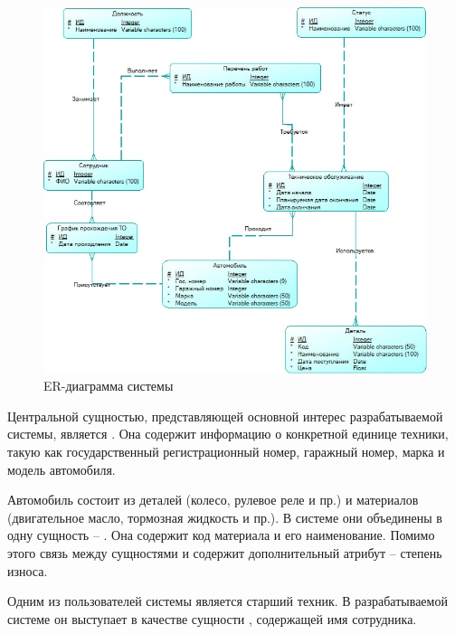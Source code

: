 \documentclass[../nirs.tex]{subfiles}
\begin{document}
\clearpage
\begin{landscape}

\begin{figure}[hp!]
  \centering
  \includegraphics[keepaspectratio,
                   width=\textwidth]{./images/er-2.jpg}
  \caption{ER-диаграмма системы}
  \label{fig:2_1_er_diagram}
\end{figure}

\end{landscape}
\clearpage

Центральной сущностью, представляющей основной интерес разрабатываемой системы,
является . Она содержит информацию о конкретной единице
техники, такую как государственный регистрационный номер, гаражный номер, марка
и модель автомобиля.

Автомобиль состоит из деталей (колесо, рулевое реле и пр.) и материалов
(двигательное масло, тормозная жидкость и пр.). В системе они объединены в одну
сущность -- . Она содержит код материала и его наименование.
Помимо этого связь между сущностями  и
 содержит дополнительный атрибут -- степень износа.

Одним из пользователей системы является старший техник. В разрабатываемой
системе он выступает в качестве сущности , содержащей
имя сотрудника.
\end{document}
